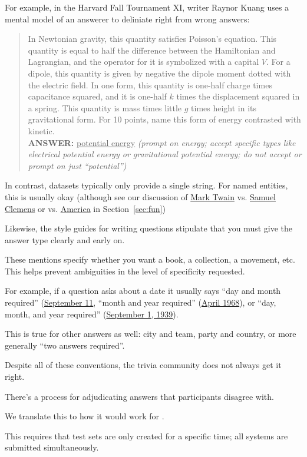 For example, in the Harvard Fall Tournament XI, writer Raynor Kuang uses a mental model of an answerer to deliniate right from wrong answers:
\begin{quote}
     In Newtonian gravity, this quantity satisfies Poisson's equation. This quantity is equal to half the difference between the Hamiltonian and Lagrangian, and the operator for it is symbolized with a capital $V$. For a dipole, this quantity is given by negative the dipole moment dotted with the electric field. In one form, this quantity is one-half charge times capacitance squared, and it is one-half $k$ times the displacement squared in a spring. This quantity is mass times little $g$ times height in its gravitational form. For 10 points, name this form of energy contrasted with kinetic.\\
    {\bf ANSWER:} \underline{potential energy} \textit{(prompt on energy; accept specific types like electrical potential energy or gravitational potential energy; do not accept or prompt on just ``potential'')}
\end{quote}
In contrast, \qa{} datasets typically only provide a single string.  For named entities, this is usually okay (although see our discussion of \underline{Mark Twain} vs. \underline{Samuel Clemens} or \underline{} vs. \underline{America} in Section~\ref{sec:fun})

Likewise, the style guides for writing questions stipulate that you
must give the answer type clearly and early on.

These mentions specify whether you want a book, a collection, a movement, etc.  This helps
prevent ambiguities in the level of specificity requested.  

For example, if a question asks about a date it usually says ``day and month required'' (\underline{September 11}, ``month and year required'' (\underline{April 1968}), or ``day, month, and year required'' (\underline{September 1, 1939}).

This is true for other answers as well: city and team, party and country, or more generally ``two answers required''.

Despite all of these conventions, the trivia community does not always get it right.

There's a process for adjudicating answers that participants disagree
with.  

We translate this to how it would work for .

This requires that test sets are only created for a specific time; all
systems are submitted simultaneously.

